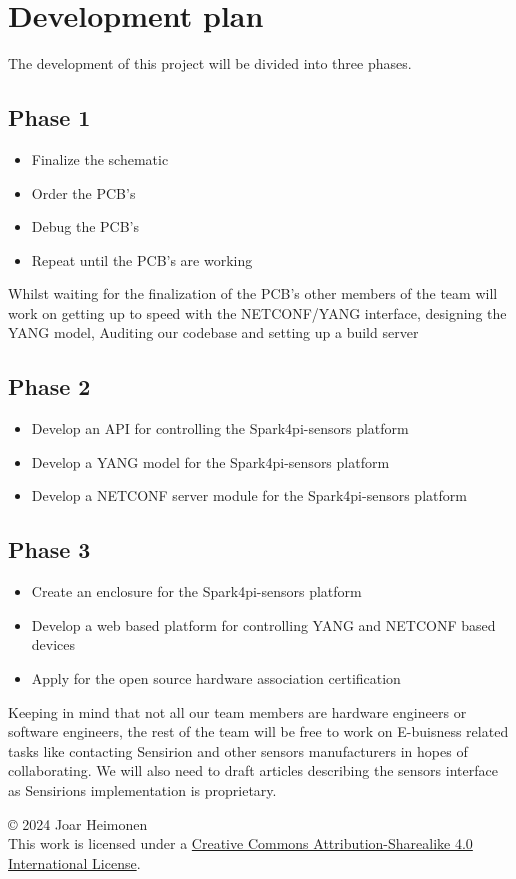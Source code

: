 \documentclass[12pt]{article}
\newcommand{\license}{
    \vspace{1em}
    \noindent\small{© 2024 Joar Heimonen\\
    This work is licensed under a \href{https://creativecommons.org/licenses/by-sa/4.0/}{Creative Commons Attribution-Sharealike 4.0 International License}.}
    \vspace{1em}
}
\begin{document}
\section{Development plan}
The development of this project will be divided into three phases.
\subsection{Phase 1}
\begin{itemize}
    \item Finalize the schematic
    \item Order the PCB's
    \item Debug the PCB's
    \item Repeat until the PCB's are working
\end{itemize}
Whilst waiting for the finalization of the PCB's other members of the team will
work on getting up to speed with the NETCONF/YANG interface, designing the 
YANG model, Auditing our codebase and setting up a build server
\subsection{Phase 2}
\begin{itemize}
    \item Develop an API for controlling the Spark4pi-sensors platform
    \item Develop a YANG model for the Spark4pi-sensors platform
    \item Develop a NETCONF server module for the Spark4pi-sensors platform
\end{itemize}
\subsection{Phase 3}
\begin{itemize}
    \item Create an enclosure for the Spark4pi-sensors platform
    \item Develop a web based platform for controlling YANG and NETCONF based devices
    \item Apply for the open source hardware association certification
\end{itemize}
Keeping in mind that not all our team members are hardware engineers or software engineers, the rest of the team will be 
free to work on E-buisness related tasks like contacting Sensirion and other sensors manufacturers in hopes of collaborating.
We will also need to draft articles describing the sensors interface as Sensirions implementation is proprietary.

\pagebreak
{}
\printbibliography
\license
\end{document}
